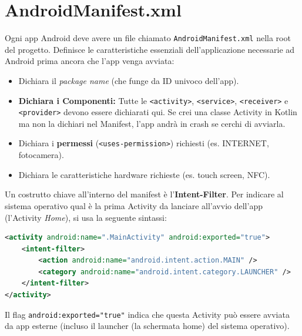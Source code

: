 \section{AndroidManifest.xml}
Ogni app Android deve avere un file chiamato \texttt{AndroidManifest.xml} nella root del progetto. 
Definisce le caratteristiche essenziali dell'applicazione necessarie ad Android prima ancora che l'app venga avviata:
\begin{itemize}
    \item Dichiara il \textit{package name} (che funge da ID univoco dell'app).
    \item \textbf{Dichiara i Componenti:} Tutte le \texttt{<activity>}, \texttt{<service>}, \texttt{<receiver>} e \texttt{<provider>} devono essere dichiarati qui. Se crei una classe Activity in Kotlin ma non la dichiari nel Manifest, l'app andrà in crash se cerchi di avviarla.
    \item Dichiara i \textbf{permessi} (\texttt{<uses-permission>}) richiesti (es. INTERNET, fotocamera).
    \item Dichiara le caratteristiche hardware richieste (es. touch screen, NFC).
\end{itemize}

Un costrutto chiave all'interno del manifest è l'\textbf{Intent-Filter}. Per indicare al sistema operativo qual è la prima Activity da lanciare all'avvio dell'app (l'Activity \textit{Home}), si usa la seguente sintassi:
\begin{lstlisting}[language=XML]
<activity android:name=".MainActivity" android:exported="true">
    <intent-filter>
        <action android:name="android.intent.action.MAIN" />
        <category android:name="android.intent.category.LAUNCHER" />
    </intent-filter>
</activity>
\end{lstlisting}
Il flag \texttt{android:exported="true"} indica che questa Activity può essere avviata da app esterne (incluso il launcher (la schermata home) del sistema operativo).